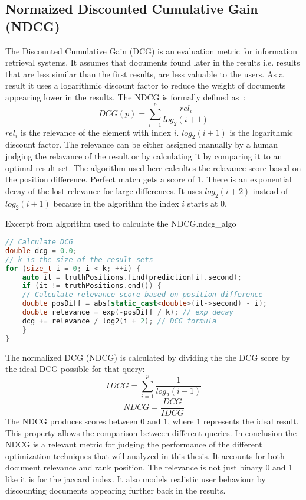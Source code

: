 \subsection{Normaized Discounted Cumulative Gain (NDCG)}
The Discounted Cumulative Gain (DCG) is an evaluation metric for information retrieval systems. It assumes that documents found later in the results i.e. results that are less similar than the first results, are less valuable to the users. As a result it uses a logarithmic discount factor to reduce the weight of documents appearing lower in the results.
The NDCG is formally defined as~\cite{ndcg}:
$$DCG(p) = \sum_{i=1}^{p} \frac{rel_i}{log_2(i+1)}$$
$rel_i$ is the relevance of the element with index $i$. $log_2(i+1)$ is the logarithmic discount factor. The relevance can be either assigned manually by a human judging the relavance of the result or by calculating it by comparing it to an optimal result set. The algorithm used here calcultes the relavance score based on the position difference. Perfect match gets a score of 1. There is an exponential decay of the lost relevance for large differences. It uses $log_2(i+2)$ instead of $log_2(i+1)$ because in the algorithm the index $i$ starts at $0$.
\begin{algorithm}{Excerpt from algorithm used to calculate the NDCG.}{ndcg_algo}
    \begin{lstlisting}[language=C++]
// Calculate DCG
double dcg = 0.0;
// k is the size of the result sets
for (size_t i = 0; i < k; ++i) {
    auto it = truthPositions.find(prediction[i].second);
    if (it != truthPositions.end()) {
    // Calculate relevance score based on position difference
    double posDiff = abs(static_cast<double>(it->second) - i);
    double relevance = exp(-posDiff / k); // exp decay
    dcg += relevance / log2(i + 2); // DCG formula
    }
}
            \end{lstlisting}
\end{algorithm}

\noindent The normalized DCG (NDCG) is calculated by dividing the the DCG score by the ideal DCG possible for that query:
$$IDCG = \sum_{i=1}^{p} \frac{1}{log_2(i+1)}$$
$$NDCG = \frac{DCG}{IDCG}$$
The NDCG produces scores between $0$ and $1$, where $1$ represents the ideal result. This property allows the comparison between different queries. In conclusion the NDCG is a relevant metric for judging the performance of the different optimization techniques that will analyzed in this thesis. It accounts for both document relevance and rank position. The relevance is not just binary 0 and 1 like it is for the jaccard index. It also models realistic user behaviour by discounting documents appearing further back in the results.